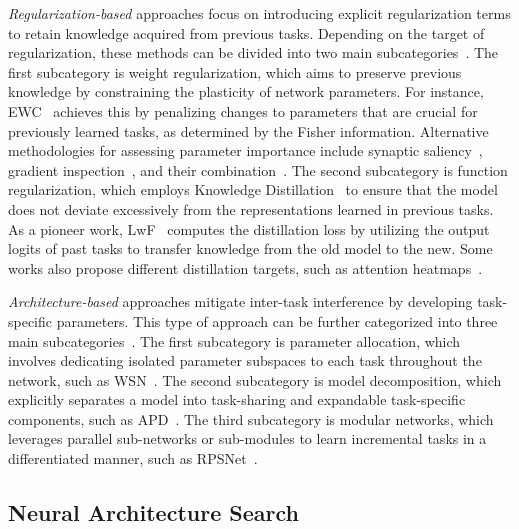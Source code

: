 \textit{Regularization-based} approaches focus on introducing explicit regularization terms to retain knowledge acquired from previous tasks. Depending on the target of regularization, these methods can be divided into two main subcategories~\cite{survey_1}. The first subcategory is weight regularization, which aims to preserve previous knowledge by constraining the plasticity of network parameters. For instance, EWC~\cite{ewc} achieves this by penalizing changes to parameters that are crucial for previously learned tasks, as determined by the Fisher information. Alternative methodologies for assessing parameter importance include synaptic saliency~\cite{si}, gradient inspection~\cite{mas}, and their combination~\cite{rwalk}. The second subcategory is function regularization, which employs Knowledge Distillation~\cite{kd} to ensure that the model does not deviate excessively from the representations learned in previous tasks. As a pioneer work, LwF~\cite{lwf} computes the distillation loss by utilizing the output logits of past tasks to transfer knowledge from the old model to the new. Some works also propose different distillation targets, such as attention heatmaps~\cite{lwm}. 

\textit{Architecture-based} approaches mitigate inter-task interference by developing task-specific parameters. This type of approach can be further categorized into three main subcategories~\cite{survey_1}. The first subcategory is parameter allocation, which involves dedicating isolated parameter subspaces to each task throughout the network, such as WSN~\cite{wsn}.  The second subcategory is model decomposition, which explicitly separates a model into task-sharing and expandable task-specific components, such as APD~\cite{APD}.  The third subcategory is modular networks, which leverages parallel sub-networks or sub-modules to learn incremental tasks in a differentiated manner, such as RPSNet~\cite{rps}. 

\subsection{Neural Architecture Search}

